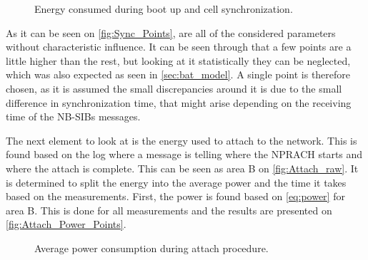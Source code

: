 \begin{figure}[H]
\centering
\begin{minipage}{0.48\textwidth}
\resizebox{\textwidth}{!}{
}
\end{minipage}
\hfill
\begin{minipage}{0.48\textwidth}
\resizebox{\textwidth}{!}{
}
\end{minipage}
\caption{Energy consumed during boot up and cell synchronization.}
\label{fig:Sync_Points}
\end{figure}

As it can be seen on \autoref{fig:Sync_Points}, are all of the considered parameters without characteristic influence. It can be seen through that a few points are a little higher than the rest, but looking at it statistically they can be neglected, which was also expected as seen in \autoref{sec:bat_model}. A single point is therefore chosen, as it is assumed the small discrepancies around it is due to the small difference in synchronization time, that might arise depending on the receiving time of the NB-SIBs messages. 

The next element to look at is the energy used to attach to the network. This is found based on the log where a message is telling where the NPRACH starts and where the attach is complete. This can be seen as area B on \autoref{fig:Attach_raw}. It is determined to split the energy into the average power and the time it takes based on the measurements. First, the power is found based on \autoref{eq:power} for area B. 
This is done for all measurements and the results are presented on \autoref{fig:Attach_Power_Points}.

\begin{figure}[H]
\centering
\begin{minipage}{0.48\textwidth}
\resizebox{\textwidth}{!}{
}
\end{minipage}
\hfill
\begin{minipage}{0.48\textwidth}
\resizebox{\textwidth}{!}{
}
\end{minipage}
\caption{Average power consumption during attach procedure.}
\label{fig:Attach_Power_Points}
\end{figure}

